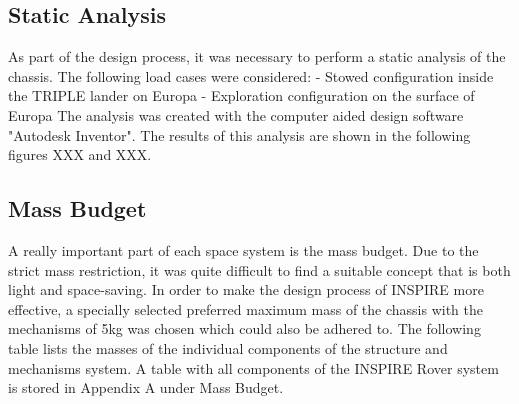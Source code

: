 \subsection{Static Analysis}

As part of the design process, it was necessary to perform a static analysis of the chassis. The following load cases were considered: 
- Stowed configuration inside the TRIPLE lander on Europa 
- Exploration configuration on the surface of Europa
The analysis was created with the computer aided design software "Autodesk Inventor". 
The results of this analysis are shown in the following figures XXX and XXX.

\subsection{Mass Budget}

A really important part of each space system is the mass budget. Due to the strict mass restriction, it was quite difficult to find a suitable concept that is both light and space-saving. In order to make the design process of INSPIRE more effective, a specially selected preferred maximum mass of the chassis with the mechanisms of 5kg was chosen which could also be adhered to. The following table lists the masses of the individual components of the structure and mechanisms system. 
A table with all components of the INSPIRE Rover system is stored in Appendix A under Mass Budget.


